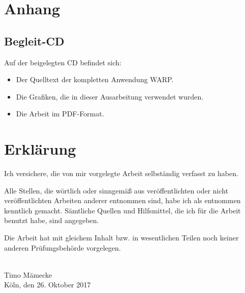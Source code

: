 
\chapter{Anhang}

\section{Begleit-CD}

Auf der beigelegten CD befindet sich:

\begin{itemize}
  \item Der Quelltext der kompletten Anwendung WARP.
  \item Die Grafiken, die in dieser Ausarbeitung verwendet wurden.
  \item Die Arbeit im PDF-Format.
\end{itemize}

\chapter*{Erklärung}

Ich versichere, die von mir vorgelegte Arbeit selbständig verfasst zu haben.

Alle Stellen, die wörtlich oder sinngemäß aus veröffentlichten oder nicht veröffentlichten Arbeiten anderer entnommen sind, habe ich als entnommen kenntlich gemacht. Sämtliche Quellen und Hilfsmittel, die ich für die Arbeit benutzt habe, sind angegeben.

Die Arbeit hat mit gleichem Inhalt bzw. in wesentlichen Teilen noch keiner anderen Prüfungsbehörde vorgelegen.

\vspace{3cm}

\makebox[.5\textwidth][r]{\hrulefill} \\
Timo Mämecke \\
Köln, den 26. Oktober 2017
